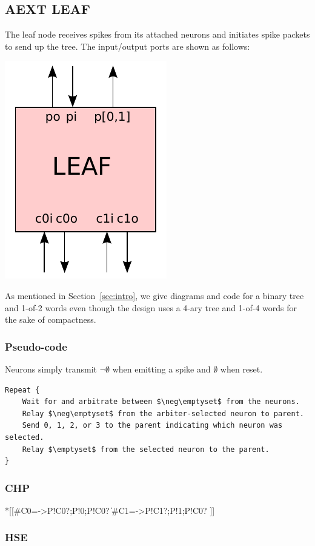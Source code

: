 \documentclass{article}
\begin{document}
\subsection{AEXT LEAF \label{sec:AEXT_LEAF}}

The leaf node receives spikes from its attached neurons and initiates spike
packets to send up the tree. The input/output ports are shown as follows:

\begin{center}
  \includegraphics[width=.16\textwidth]{img/aext_leaf.pdf}
\end{center}

\noindent
As mentioned in Section~\ref{sec:intro}, 
we give diagrams and code for a binary tree and 1-of-2 words
even though the design uses a 4-ary tree and 1-of-4 words
for the sake of compactness.

\subsubsection*{Pseudo-code}

Neurons simply transmit $\neg\emptyset$ when emitting a spike and 
$\emptyset$ when reset.

\begin{lstlisting}[mathescape]
Repeat {
    Wait for and arbitrate between $\neg\emptyset$ from the neurons.
    Relay $\neg\emptyset$ from the arbiter-selected neuron to parent.
    Send 0, 1, 2, or 3 to the parent indicating which neuron was selected.
    Relay $\emptyset$ from the selected neuron to the parent.
}
\end{lstlisting}

\subsubsection*{CHP}

\begin{csp}
*[[#{C0=\neg\emptyset}->P!C0?;P!0;P!C0?
  \|#{C1=\neg\emptyset}->P!C1?;P!1;P!C0?
 ]]
\end{csp}

\subsubsection*{HSE}
\end{document}
